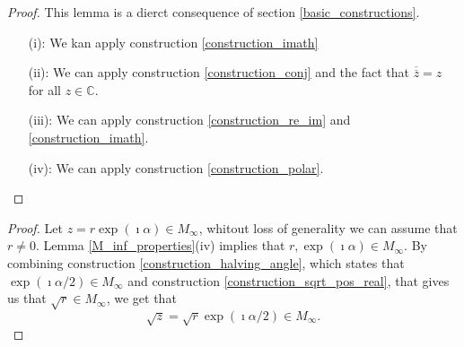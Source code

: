 \begin{proof}
    This lemma is a dierct consequence of section \ref{basic_constructions}.
    \begin{itemize}
        \item[(i):] We kan apply construction \ref{construction_imath}
        \item[(ii):] We can apply construction \ref{construction_conj} and the fact that $\overline{\overline z} = z$ for all $z \in\mathbb{C}$.
        \item[(iii):] We can apply construction \ref{construction_re_im} and \ref{construction_imath}.
        \item[(iv):] We can apply construction \ref{construction_polar}.
    \end{itemize}
\end{proof}

\begin{proof}
    Let $z = r \exp(\imath \alpha) \in M_{\infty}$, whitout loss of generality we can assume that $r \ne 0$. 
    Lemma \ref{M_inf_properties}(iv) implies that $r, \exp(\imath \alpha) \in M_{\infty}$. By combining construction \ref{construction_halving_angle},
    which states that $\exp(\imath \alpha / 2) \in M_{\infty}$ and construction \ref{construction_sqrt_pos_real},
    that gives us that $\sqrt{r} \in M_{\infty}$, we get that $$\sqrt{z} = \sqrt{r} \exp(\imath \alpha / 2) \in M_{\infty}.$$
\end{proof}

